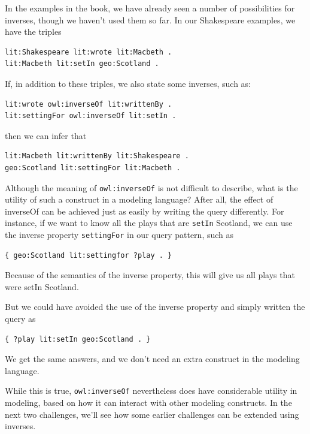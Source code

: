 In the examples in the book, we have already seen a number of
possibilities for inverses, though we haven't used them so far. In our
Shakespeare examples, we have the triples

\begin{lstlisting}
lit:Shakespeare lit:wrote lit:Macbeth .
lit:Macbeth lit:setIn geo:Scotland .
\end{lstlisting}

If, in addition to these triples, we also state some inverses, such as:

\begin{lstlisting}
lit:wrote owl:inverseOf lit:writtenBy .
lit:settingFor owl:inverseOf lit:setIn .
\end{lstlisting}

then we can infer that

\begin{lstlisting}
lit:Macbeth lit:writtenBy lit:Shakespeare .
geo:Scotland lit:settingFor lit:Macbeth .
\end{lstlisting}

Although the meaning of \texttt{owl:inverseOf} is not difficult to describe, what
is the utility of such a construct in a modeling language? After all,
the effect of inverseOf can be achieved just as easily by writing the
query differently. For instance, if we want to know all the plays that
are \texttt{setIn} Scotland, we can use the inverse property \texttt{settingFor} in our
query pattern, such as

\begin{lstlisting}
{ geo:Scotland lit:settingfor ?play . }
\end{lstlisting}

Because of the semantics of the inverse property, this will give us all
plays that were setIn
Scotland.

But we could have avoided the use of the inverse property and simply
written the query as

\begin{lstlisting}
{ ?play lit:setIn geo:Scotland . }
\end{lstlisting}

We get the same answers, and we don't need an extra construct in the
modeling language.

While this is true, \texttt{owl:inverseOf} nevertheless does have considerable
utility in modeling, based on how it can interact with other modeling
constructs. In the next two challenges, we'll see how some earlier
challenges can be extended using inverses.

